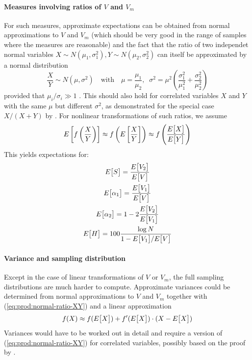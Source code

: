 \documentclass[a4paper]{article}
\begin{document}
\paragraph*{Measures involving ratios of $V$ and $V_m$}
For such measures, approximate expectations can be obtained from normal
approximations to $V$ and $V_m$ (which should be very good in the range of
samples where the measures are reasonable) and the fact that the ratio of two
independet normal variables
$X\sim N(\mu_1, \sigma_1^2), Y\sim N(\mu_2, \sigma_2^2)$ can itself be
approximated by a normal distribution
\begin{equation}
  \label{eq:prod:normal-ratio-XY}
  \frac{X}{Y} \sim N(\mu, \sigma^2)
  \quad\text{with}\quad
  \mu = \frac{\mu_1}{\mu_2},\;\;
  \sigma^2 = \mu^2 \left( \frac{\sigma_1^2}{\mu_1^2} + \frac{\sigma_2^2}{\mu_2^2} \right)
\end{equation}
provided that $\mu_i / \sigma_i \gg 1$ \citep[313]{DiazFrances:Rubio:13}.
This should also hold for correlated variables $X$ and $Y$ with the same $\mu$
but different $\sigma^2$, as demonstrated for the special case $X / (X+Y)$ by
\citet[Lemma A.8]{Evert:04phd}.  For nonlinear transformations of such ratios,
we assume
\begin{equation}
  E_{}\left[ f\left( \frac{X}{Y} \right) \right]
  \approx f\left( E_{}\left[\frac{X}{Y}\right] \right)
  \approx f\left( \frac{E_{}\bigl[X\bigr]}{E_{}\bigl[Y\bigr]} \right)
\end{equation}
This yields expectations for:
\begin{gather}
  E_{}\bigl[S\bigr] = \frac{E_{}\bigl[V_2\bigr]}{E_{}\bigl[V\bigr]} \\
  E_{}\bigl[\alpha_1\bigr] = \frac{E_{}\bigl[V_1\bigr]}{E_{}\bigl[V\bigr]} \\
  E_{}\bigl[\alpha_2\bigr] = 1 - 2 \frac{E_{}\bigl[V_2\bigr]}{E_{}\bigl[V_1\bigr]} \\
  E_{}\bigl[H\bigr] = 100 \frac{\log N}{1 - E_{}\bigl[V_1\bigr] / E_{}\bigl[V\bigr]}
\end{gather}

\paragraph*{Variance and sampling distribution}
Except in the case of linear transformations of $V$ or $V_m$, the full
sampling distributions are much harder to compute.  Approximate variances
could be determined from normal approximations to $V$ and $V_m$ together with
(\ref{eq:prod:normal-ratio-XY}) and a linear approximation
\[
  f(X) \approx f(E_{}\bigl[X\bigr]) + f'(E_{}\bigl[X\bigr])\cdot (X - E_{}\bigl[X\bigr])
\]
Variances would have to be worked out in detail and require a version of
(\ref{eq:prod:normal-ratio-XY}) for correlated variables, possibly based
on the proof by \citet[Lemma A.8]{Evert:04phd}.
\end{document}
